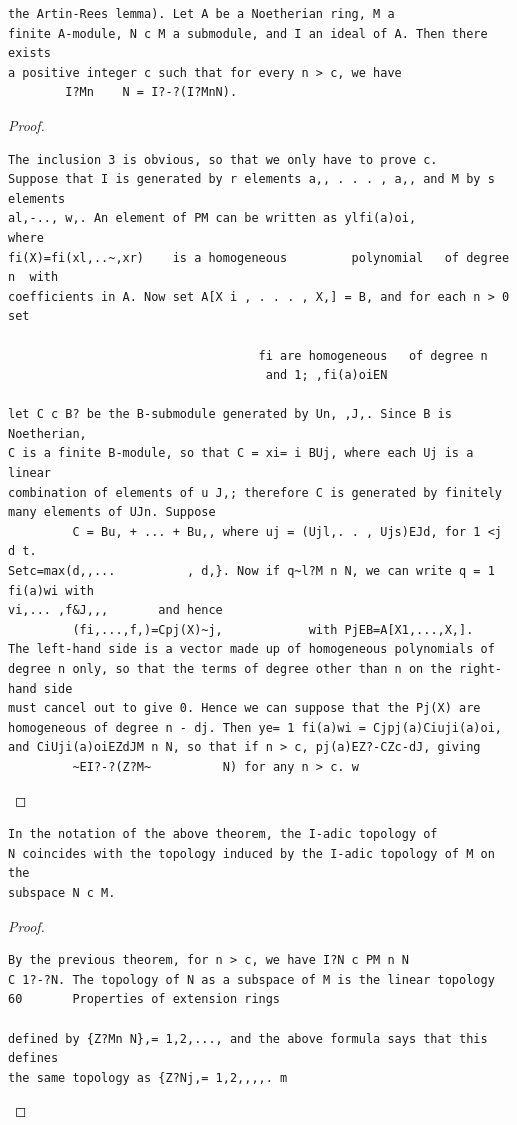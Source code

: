 \begin{theorem}\label{mcrt-auto-theorem-8-5}\uses{}
\begin{verbatim}
the Artin-Rees lemma). Let A be a Noetherian ring, M a
finite A-module, N c M a submodule, and I an ideal of A. Then there exists
a positive integer c such that for every n > c, we have
        I?Mn    N = I?-?(I?MnN).
\end{verbatim}
\end{theorem}
\begin{proof}
\begin{verbatim}
The inclusion 3 is obvious, so that we only have to prove c.
Suppose that I is generated by r elements a,, . . . , a,, and M by s elements
al,-.., w,. An element of PM can be written as ylfi(a)oi,                where
fi(X)=fi(xl,..~,xr)    is a homogeneous         polynomial   of degree  n  with
coefficients in A. Now set A[X i , . . . , X,] = B, and for each n > 0 set

                                   fi are homogeneous   of degree n
                                    and 1; ,fi(a)oiEN

let C c B? be the B-submodule generated by Un, ,J,. Since B is Noetherian,
C is a finite B-module, so that C = xi= i BUj, where each Uj is a linear
combination of elements of u J,; therefore C is generated by finitely
many elements of UJn. Suppose
         C = Bu, + ... + Bu,, where uj = (Ujl,. . , Ujs)EJd, for 1 <j d t.
Setc=max(d,,...          , d,}. Now if q~l?M n N, we can write q = 1 fi(a)wi with
vi,... ,f&J,,,       and hence
         (fi,...,f,)=Cpj(X)~j,            with PjEB=A[X1,...,X,].
The left-hand side is a vector made up of homogeneous polynomials of
degree n only, so that the terms of degree other than n on the right-hand side
must cancel out to give 0. Hence we can suppose that the Pj(X) are
homogeneous of degree n - dj. Then ye= 1 fi(a)wi = Cjpj(a)Ciuji(a)oi,
and CiUji(a)oiEZdJM n N, so that if n > c, pj(a)EZ?-CZc-dJ, giving
         ~EI?-?(Z?M~          N) for any n > c. w
\end{verbatim}
\end{proof}


\begin{theorem}\label{mcrt-auto-theorem-8-6}\uses{}
\begin{verbatim}
In the notation of the above theorem, the I-adic topology of
N coincides with the topology induced by the I-adic topology of M on the
subspace N c M.
\end{verbatim}
\end{theorem}
\begin{proof}
\begin{verbatim}
By the previous theorem, for n > c, we have I?N c PM n N
C 1?-?N. The topology of N as a subspace of M is the linear topology
60       Properties of extension rings

defined by {Z?Mn N},= 1,2,..., and the above formula says that this defines
the same topology as {Z?Nj,= 1,2,,,,. m
\end{verbatim}
\end{proof}


